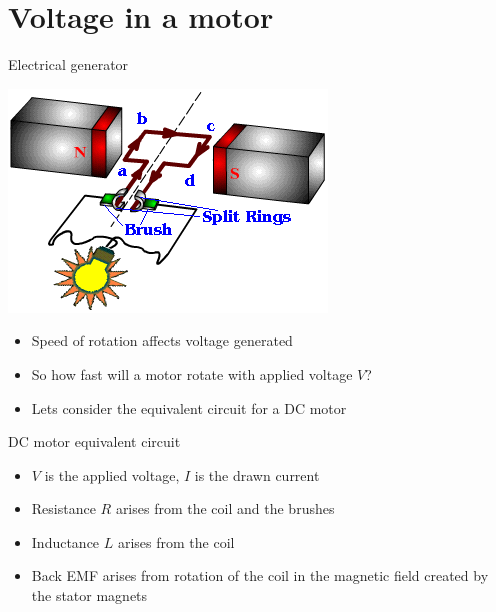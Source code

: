 \documentclass[compress]{beamer}
\begin{document}
\section[Voltage]{Voltage in a motor}

\begin{frame}{Electrical generator}

    \begin{center}
        \includegraphics[width=0.6\linewidth]{image30}
    \end{center}

\begin{itemize}

\item Speed of rotation affects voltage generated
\item So how fast will a motor rotate with applied voltage $V$?
\item Lets consider the equivalent circuit for a DC motor
\end{itemize}
\end{frame}

\begin{frame}{DC motor equivalent circuit}

    \begin{center}
    \end{center}

\footnotesize
\begin{itemize}

\item $V$ is the applied voltage, $I$ is the drawn current
\item Resistance $R$ arises from the coil and the brushes
\item Inductance $L$ arises from the coil
\item Back EMF arises from rotation of the coil in the magnetic field
  created by the stator magnets
\end{itemize}

\end{frame}
\end{document}
